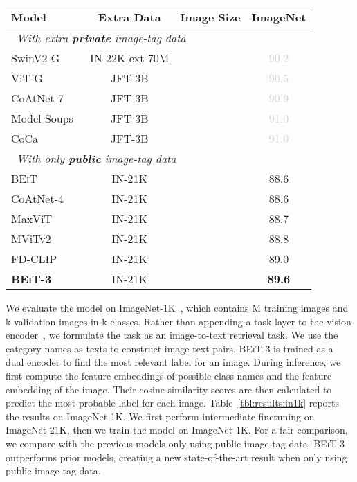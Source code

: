 \documentclass{article}
\newcommand\our{\textsc{BEiT-3}}
\newcommand\beit{\textsc{BEiT}}
\begin{document}
\begin{table*}[t]
\centering
\begin{tabular}{@{}lccc@{}}
\toprule
\bf Model & \bf Extra Data & \bf Image Size & \bf ImageNet \\
\midrule
\multicolumn{4}{l}{~\textit{With extra \textbf{private} image-tag data}} \\
SwinV2-G~\citep{swinv2} & IN-22K-ext-70M &  & \textcolor{lightgray}{90.2} \\
ViT-G~\citep{scaling:vit} & JFT-3B &  & \textcolor{lightgray}{90.5} \\
CoAtNet-7~\citep{coatnet} & JFT-3B &  & \textcolor{lightgray}{90.9} \\
Model Soups~\citep{modelsoups} & JFT-3B &  & \textcolor{lightgray}{91.0} \\
CoCa~\citep{coca} & JFT-3B &  & \textcolor{lightgray}{91.0} \\
\midrule
\multicolumn{4}{l}{~\textit{With only \textbf{public} image-tag data}} \\
\beit{}~\citep{beit} & IN-21K &  & 88.6 \\
CoAtNet-4~\citep{coatnet} & IN-21K &  & 88.6 \\
MaxViT~\citep{maxvit} & IN-21K &  & 88.7 \\
MViTv2~\citep{mvitv2} & IN-21K &  & 88.8 \\
FD-CLIP~\citep{fd-swin} & IN-21K &  & 89.0 \\
\bf \our{} & IN-21K &  & \bf 89.6 \\
\bottomrule
\end{tabular}
\caption{Top-1 accuracy on ImageNet-1K.
}
\label{tbl:results:in1k}
\end{table*}


We evaluate the model on ImageNet-1K~\citep{imagenet}, which contains M training images and k validation images in k classes.
Rather than appending a task layer to the vision encoder~\citep{vit,beit}, we formulate the task as an image-to-text retrieval task.
We use the category names as texts to construct image-text pairs.
\our{} is trained as a dual encoder to find the most relevant label for an image.
During inference, we first compute the feature embeddings of possible class names and the feature embedding of the image.
Their cosine similarity scores are then calculated to predict the most probable label for each image.
Table~\ref{tbl:results:in1k} reports the results on ImageNet-1K. 
We first perform intermediate finetuning on ImageNet-21K, then we train the model on ImageNet-1K.
For a fair comparison, we compare with the previous models only using public image-tag data.
\our{} outperforms prior models, creating a new state-of-the-art result when only using public image-tag data. 
\end{document}
